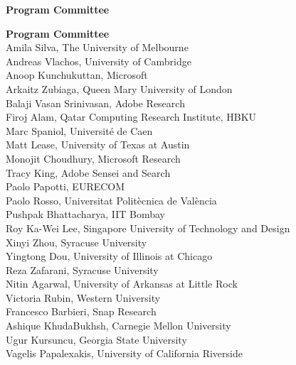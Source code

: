 \documentclass[11pt,oneside]{book}
\begin{document}
\begin{center}
\Large \textbf{Program Committee}
\end{center}
\vspace*{1cm}
\begin{description}
  \item{\bf Program Committee}\vspace{2mm}\\
            Amila Silva, The University of Melbourne\\
          Andreas Vlachos, University of Cambridge\\
          Anoop Kunchukuttan, Microsoft\\
          Arkaitz Zubiaga, Queen Mary University of London\\
          Balaji Vasan Srinivasan, Adobe Research\\
          Firoj Alam, Qatar Computing Research Institute, HBKU\\
          Marc Spaniol, Université de Caen\\
          Matt Lease, University of Texas at Austin\\
          Monojit Choudhury, Microsoft Research\\
          Tracy King, Adobe Sensei and Search\\
          Paolo Papotti, EURECOM\\
          Paolo Rosso, Universitat Politècnica de València\\
          Pushpak Bhattacharya, IIT Bombay\\
          Roy Ka-Wei Lee, Singapore University of Technology and Design\\
          Xinyi Zhou, Syracuse University\\
          Yingtong Dou, University of Illinois at Chicago\\
          Reza Zafarani, Syracuse University\\
          Nitin Agarwal, University of Arkansas at Little Rock\\
          Victoria Rubin, Western University\\
          Francesco Barbieri, Snap Research\\
          Ashique KhudaBukhsh, Carnegie Mellon University\\
          Ugur Kursuncu, Georgia State University\\
          Vagelis Papalexakis, University of California Riverside\\

\end{description}
\end{document}
